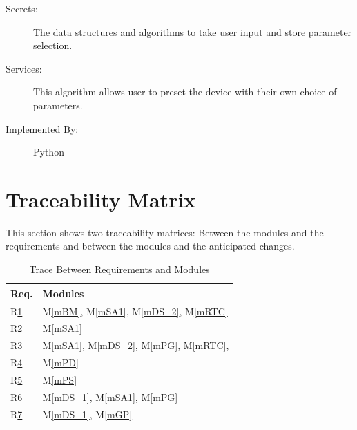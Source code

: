 \documentclass[12pt, titlepage]{article}
\newcommand{\mref}[1]{M\ref{#1}}
\begin{document}
\begin{description}
  \item[Secrets:] The data structures and algorithms to take user input and store parameter selection.
  \item[Services:] This algorithm allows user to preset the device with their own choice of parameters.
  \item[Implemented By:] Python
\end{description}
\newpage
\section{Traceability Matrix} \label{SecTM}

This section shows two traceability matrices: Between the modules and the
requirements and between the modules and the anticipated changes.

\begin{table}[H]
  \centering
  \begin{tabular}{p{} p{}}
    \toprule
    \textbf{Req.} & \textbf{Modules}                                                                           \\
    \midrule
    R\href{https://github.com/zakerl/Capstone_Project/blob/main/docs/SRS/SRS.pdf}{1}            & \mref{mBM}, \mref{mSA1}, \mref{mDS_2}, \mref{mRTC}                               \\
    R\href{https://github.com/zakerl/Capstone_Project/blob/main/docs/SRS/SRS.pdf}{2}            & \mref{mSA1} \\
    R\href{https://github.com/zakerl/Capstone_Project/blob/main/docs/SRS/SRS.pdf}{3}            & \mref{mSA1}, \mref{mDS_2}, \mref{mPG}, \mref{mRTC},                                                                             \\
    R\href{https://github.com/zakerl/Capstone_Project/blob/main/docs/SRS/SRS.pdf}{4}            & \mref{mPD}                                                    \\
    R\href{https://github.com/zakerl/Capstone_Project/blob/main/docs/SRS/SRS.pdf}{5}            & \mref{mPS} \\
    R\href{https://github.com/zakerl/Capstone_Project/blob/main/docs/SRS/SRS.pdf}{6}            &\mref{mDS_1}, \mref{mSA1}, \mref{mPG}\\
    R\href{https://github.com/zakerl/Capstone_Project/blob/main/docs/SRS/SRS.pdf}{7}           &\mref{mDS_1}, \mref{mGP}             \\
    \bottomrule
  \end{tabular}
  \caption{Trace Between Requirements and Modules}
  \label{TblRT}
\end{table}
\end{document}
